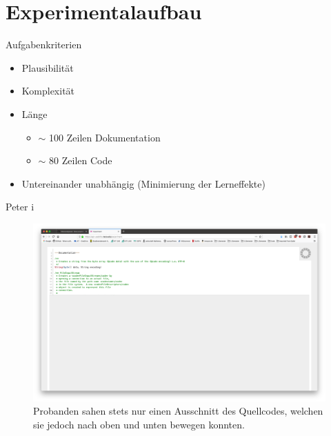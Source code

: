\documentclass[10pt]{beamer}
\begin{document}
\section{Experimentalaufbau}

	\begin{frame}{Aufgabenkriterien}
		\begin{itemize}
			\item Plausibilität\\
			\vspace{\baselineskip}
			\item Komplexität\\
			\vspace{\baselineskip}
			\item Länge
			\begin{itemize}
				\item $\sim$ 100 Zeilen Dokumentation
				\item $\sim$ 80 Zeilen Code
			\end{itemize}
			\vspace{\baselineskip}
			\item Untereinander unabhängig (Minimierung der Lerneffekte)\\
		\end{itemize}
	\end{frame}

	\begin{frame}{Peter  i}
		\begin{figure}
			\includegraphics[scale=0.15]{graphics/peter_window.png}
			\caption{\label{fig:peter_window.png} Probanden sahen stets nur einen Ausschnitt des Quellcodes, welchen sie jedoch nach oben und unten bewegen konnten.}
		\end{figure}
	\end{frame}
\end{document}
